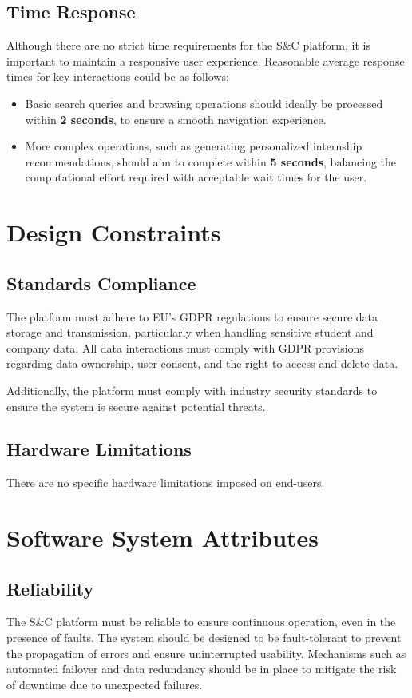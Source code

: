 \subsection{Time Response}
Although there are no strict time requirements for the S\&C platform, it is important to maintain a responsive user experience. Reasonable average response times for key interactions could be as follows:
\begin{itemize}
    \item Basic search queries and browsing operations should ideally be processed within \textbf{2 seconds}, to ensure a smooth navigation experience.
    \item More complex operations, such as generating personalized internship recommendations, should aim to complete within \textbf{5 seconds}, balancing the computational effort required with acceptable wait times for the user.
\end{itemize}

\section{Design Constraints}

\subsection{Standards Compliance}

The platform must adhere to EU's GDPR regulations to ensure secure data storage and transmission, particularly when handling sensitive student and company data. All data interactions must comply with GDPR provisions regarding data ownership, user consent, and the right to access and delete data.

Additionally, the platform must comply with industry security standards to ensure the system is secure against potential threats.

\subsection{Hardware Limitations}

There are no specific hardware limitations imposed on end-users.

\section{Software System Attributes}

\subsection{Reliability}
The S\&C platform must be reliable to ensure continuous operation, even in the presence of faults. The system should be designed to be fault-tolerant to prevent the propagation of errors and ensure uninterrupted usability. Mechanisms such as automated failover and data redundancy should be in place to mitigate the risk of downtime due to unexpected failures.

